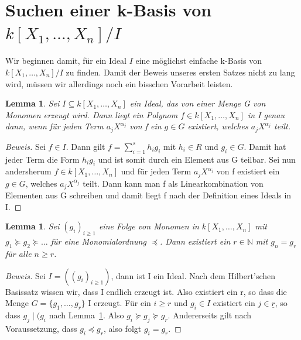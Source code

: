 \documentclass{article}
\newtheorem{lemma}[satz]{Lemma}
\newcommand*{\R}{k[X_{1},\ldots,X_{n}]}
\begin{document}
\section{Suchen einer k-Basis von \(\R/I\)}
	
	Wir beginnen damit, für ein Ideal \(I\) eine möglichst einfache k-Basis von \(\R/I\) zu finden.
	Damit der Beweis unseres ersten Satzes nicht zu lang wird, müssen wir allerdings noch ein
	bisschen Vorarbeit leisten.

	\begin{lemma} \label{1.2.3}
	Sei \(I \subseteq \R\) ein Ideal, das von einer Menge G von Monomen erzeugt wird. Dann liegt
	ein Polynom \(f \in \R\) in I genau dann, wenn für jeden Term \(a_{j}X^{\alpha_{j}}\) von f ein
	\(g \in G\) existiert, welches \(a_{j}X^{\alpha_{j}}\) teilt.
	\end{lemma}

	\begin{proof}[Beweis]
	Sei \(f \in I\). Dann gilt \(f = \sum_{i=1}^{s} h_{i}g_{i}\) mit \(h_{i} \in R\) und \(g_{i}
	\in G\). Damit hat jeder Term die Form \(h_{i}g_{i}\) und ist somit durch ein Element aus G
	teilbar.
	Sei nun andersherum \(f \in \R\) und für jeden Term \(a_{j}X^{\alpha_{j}}\) von f existiert ein
	\(g \in G\), welches \(a_{j}X^{\alpha_{j}}\) teilt. Dann kann man f als Linearkombination von 
	Elementen aus G schreiben und damit liegt f nach der Definition eines Ideals in I.
	\end{proof}


	\begin{lemma} \label{1.2.4}
	Sei \((g_{i})_{i \geq 1}\) eine Folge von Monomen in \(\R\) mit \(g_{1} \succeq g_{2} \succeq
	\ldots\) für eine Monomialordnung \(\preceq\). Dann existiert ein \(r \in \mathbb{N}\) mit 
	\(g_{n} = g_{r}\) für alle \(n \geq r\). 
	\end{lemma}

	\begin{proof}[Beweis]
	Sei \(I = ((g_{i})_{i \geq 1})\), dann ist I ein Ideal. Nach dem Hilbert'schen Basissatz
	wissen wir, dass I endlich erzeugt ist. Also existiert ein r, so dass die Menge \(G = \{g_{1},
	\ldots, g_{r}\}\) I erzeugt. Für ein \(i \geq r\) und \(g_{i} \in I\) existiert ein
	\(j \in \underline{r}\), so dass \(g_{j}\; | \;(g_{i}\) nach Lemma~\ref{1.2.3}. Also \(g_{i}
	\succeq g_{j} \succeq g_{r}\). Andererseits gilt nach Voraussetzung, dass \(g_{i} \preceq g_{r}
	\), also folgt \(g_{i} = g_{r}\).
	\end{proof}
\end{document}
